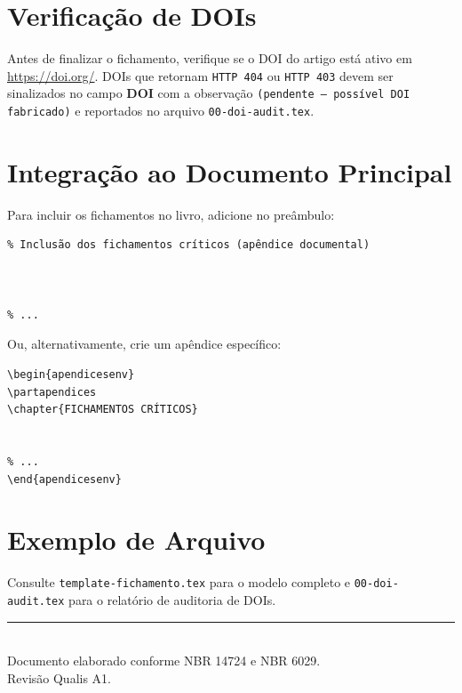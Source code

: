 \section*{Verificação de DOIs}
Antes de finalizar o fichamento, verifique se o DOI do artigo está ativo
em \url{https://doi.org/}. DOIs que retornam \texttt{HTTP 404} ou
\texttt{HTTP 403} devem ser sinalizados no campo \textbf{DOI} com a
observação \texttt{(pendente -- possível DOI fabricado)} e reportados no
arquivo \texttt{00-doi-audit.tex}.

\section*{Integração ao Documento Principal}
Para incluir os fichamentos no livro, adicione no preâmbulo:
\begin{verbatim}
% Inclusão dos fichamentos críticos (apêndice documental)



% ...
\end{verbatim}
Ou, alternativamente, crie um apêndice específico:
\begin{verbatim}
\begin{apendicesenv}
\partapendices
\chapter{FICHAMENTOS CRÍTICOS}


% ...
\end{apendicesenv}
\end{verbatim}

\section*{Exemplo de Arquivo}
Consulte \texttt{template-fichamento.tex} para o modelo completo e
\texttt{00-doi-audit.tex} para o relatório de auditoria de DOIs.

\vfill
\begin{center}
\rule{0.5\textwidth}{0.4pt}\\
\small{Documento elaborado conforme NBR 14724 e NBR 6029.}\\
\small{Revisão Qualis A1.}
\end{center}
